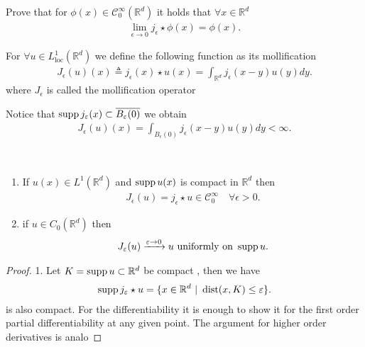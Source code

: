 \begin{exercise}
 Prove that for $\phi(x) \in  \mathcal{C}_0^{\infty}(\mathbb{R}^{d} ) $  it holds that $\forall x \in  \mathbb{R}^{d} $
 \begin{align*}
   \lim_{\epsilon \to 0}j_{\epsilon} \star \phi(x) = \phi(x)
 .\end{align*}
\end{exercise}
\begin{definition}
  For $\forall u \in  L_{\text{loc}}^{1}(\mathbb{R}^{d} ) $  we define the following function as its mollification 
  \begin{align*}
    J_{\epsilon}(u)(x) \triangleq j_{\epsilon}(x) \star u(x) = \int_{\mathbb{R}^{d} }j_{\epsilon}(x-y)u(y)dy
  .\end{align*}
  where $J_{\epsilon}$ is called the mollification operator
\end{definition}
\begin{remark}
  Notice that $\operatorname*{supp} j_{\varepsilon}(x) \subset  \overline{B_{\varepsilon}(0)} $  we obtain 
  \begin{align*}
    J_{\epsilon}(u)(x) = \int_{B_{\epsilon}(0)}j_{\epsilon}(x-y)u(y) dy < \infty
  .\end{align*}
\end{remark}
\begin{lemma}\hspace{0mm}\\
  \begin{enumerate}
    \item If $u(x) \in  L^{1}(\mathbb{R}^{d} ) $  and $\operatorname*{supp} u(x)$ is compact in $\mathbb{R}^{d} $ then 
      \begin{align*}
        J_{\epsilon}(u) = j_{\epsilon} \star  u \in \mathcal{C}_0^{\infty} \quad \forall  \epsilon > 0
      .\end{align*}
    \item if $u \in  C_0(\mathbb{R}^{d} )$ then 
      \begin{align*}
        J_{\varepsilon}(u) \xrightarrow{\varepsilon \to 0} u \text{ uniformly on } \operatorname*{supp} u
      .\end{align*}
  \end{enumerate}
\end{lemma}
\begin{proof}
 1. Let $K = \operatorname*{supp} u \subset  \mathbb{R}^{d} $ be compact , then we have 
 \begin{align*}
   \supp j_{\epsilon} \star  u = \{x \in  \mathbb{R}^{d} \ | \ \dist(x,K) \le \epsilon  \}  
 .\end{align*}
 is also compact. For the differentiability  it is enough to show it for the first order partial 
 differentiability at any given point. The argument for higher order derivatives is analo
\end{proof}
